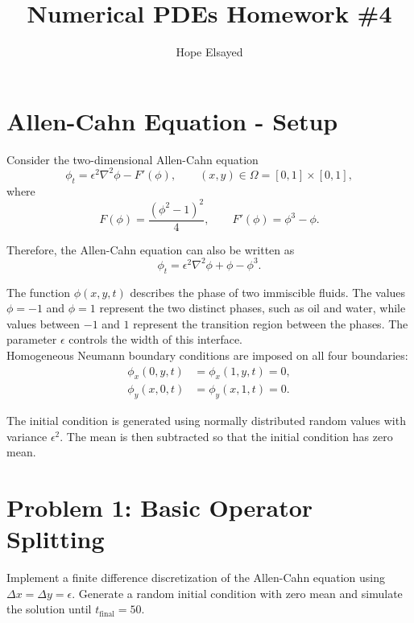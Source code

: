 \documentclass[11pt]{article}
\title{Numerical PDEs Homework \#4}
\author{Hope Elsayed}
\date{} %
\begin{document}
\maketitle
\vspace{-1.5cm}

\section*{Allen-Cahn Equation - Setup}

Consider the two-dimensional Allen-Cahn equation
\[
    \phi_t = \epsilon^2 \nabla^2 \phi - F'(\phi),
    \qquad (x,y) \in \Omega = [0,1]\times[0,1],
\]
where
\[
    F(\phi) = \frac{(\phi^2-1)^2}{4},
    \qquad
    F'(\phi) = \phi^3-\phi.
\]

Therefore, the Allen-Cahn equation can also be written as
\[
    \phi_t = \epsilon^2 \nabla^2 \phi + \phi-\phi^3.
\]

The function $\phi(x,y,t)$ describes the phase of two  immiscible fluids. The values $\phi=-1$ and $\phi=1$ represent the two distinct phases, such as oil and water, while values between $-1$ and $1$ represent the transition region between  the phases. The parameter $\epsilon$ controls the width of this interface. \\

Homogeneous Neumann boundary conditions are imposed on 
all four boundaries:
\begin{align*}
    \phi_x(0,y,t) &= \phi_x(1,y,t)=0,\\
    \phi_y(x,0,t) &= \phi_y(x,1,t)=0.
\end{align*}

The initial condition is generated using normally  distributed random values with variance $\epsilon^2$.  The mean is then subtracted so that the initial condition has zero mean.

\newpage

\section*{Problem 1: Basic Operator Splitting}

Implement a finite difference discretization of the Allen-Cahn equation using $\Delta x=\Delta y=\epsilon$. Generate a random initial condition with zero mean and simulate the solution until $t_{\mathrm{final}}=50$.
\end{document}
